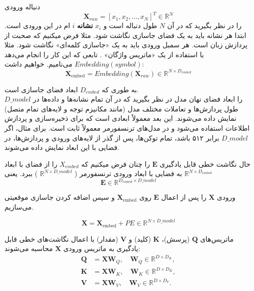 
دنباله ورودی
$$\mathbf{X}_{raw} = [x_1, x_2, \dots, x_N]^T \in \mathbb{R}^{N}$$
را در نظر بگیرید که در آن $N$ طول دنباله است و $ x_i $
\textbf{نشانه}
$i$
ام در این ورودی است. ابتدا هر نشانه باید به یک فضای جاسازی نگاشت شود. مثلا فرض میکنیم که صحبت از پردازش زبان است. هر سمبل ورودی باید به یک «جاسازی کلمه‌ای»%
نگاشت شود. مثلا با استفاده از یک «ماتریس واژگان»%
.
تابعی که این کار را انجام می‌دهد $ Embedding(symbol) $ می‌نامیم. خواهیم داشت:
 $$
 \mathbf{X}_{\text{embed}} = Embedding(\mathbf{X}_{raw}) \in \mathbb{R}^{N \times D_{embed}}
 $$ 

به طوری که $ D_{embed} $ ابعاد فضای جاسازی است.\\
$ D\_{model} $
را ابعاد فضای نهان مدل در نظر بگیرید که در آن تمام نشانه‌ها و داده‌ها در طول پردازش‌ها و تعاملات مختلف مدل (مانند مکانیزم توجه و لایه‌های تمام متصل) نمایش داده می‌شوند. این بعد معمولاً ابعادی است که برای ذخیره‌سازی و پردازش اطلاعات استفاده می‌شود و در مدل‌های ترنسفورمر معمولاً ثابت است. برای مثال، اگر $ D\_{model}$ برابر ۵۱۲ باشد، تمام توکن‌ها، پس از گذر از لایه‌های ورودی و پردازش‌ها، در فضایی با این ابعاد نمایش داده می‌شوند.

حال نگاشت خطی قابل یادگیری $ \mathbf{E} $ را چنان فرض میکنیم که $ X_{embed} $ را از فضای با ابعاد
$\mathbb{R}^{N \times D_{embed}}$
به فضایی با ابعاد ورودی ترنسفورمر (
$\mathbb{R}^{N \times D\_{model}}$
) ببرد. یعنی
$$
	\mathbf{E} \in \mathbb{R}^{D_{embed} \times D\_{model}}
$$

ورودی $ \mathbf{X} $ را پس از اعمال $\mathbf{E} $ روی $ \mathbf{X}_{\text{embed}} $ و سپس اضافه کردن جاسازی موقعیتی می‌سازیم.

\begin{equation}
	\mathbf{X} = \mathbf{X}_{\text{embed}} + PE \in \mathbb{R}^{N \times D\_{model}}
\end{equation}



ماتریس‌های $\mathbf{Q}$ (پرسش)، $\mathbf{K}$ (کلید) و $\mathbf{V}$ (مقدار) با اعمال نگاشت‌های خطی قابل یادگیری به ماتریس ورودی $\mathbf{X}$ محاسبه می‌شوند:
\begin{align*}
	\mathbf{Q} &= \mathbf{X} \mathbf{W}_Q, \quad \mathbf{W}_Q \in \mathbb{R}^{D \times D_K}, \\
	\mathbf{K} &= \mathbf{X} \mathbf{W}_K, \quad \mathbf{W}_K \in \mathbb{R}^{D \times D_K}, \\
	\mathbf{V} &= \mathbf{X} \mathbf{W}_V, \quad \mathbf{W}_V \in \mathbb{R}^{D \times D_V}.
\end{align*}

